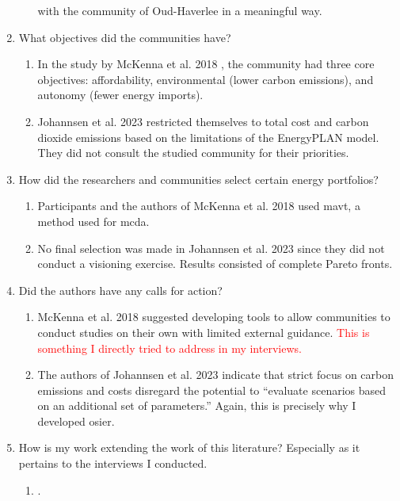 \begin{enumerate}
\begin{enumerate}
        with the community of Oud-Haverlee in a meaningful way.
    \end{enumerate}
    \item What objectives did the communities have?
    \begin{enumerate}
        \item In the study by McKenna et al. 2018 \cite{mckenna_combining_2018},
        the community had three core objectives: affordability, environmental
        (lower carbon emissions), and autonomy (fewer energy imports).
        \item Johannsen et al. 2023 \cite{johannsen_municipal_2023} restricted themselves
        to total cost and carbon dioxide emissions based on the limitations of
        the EnergyPLAN model. They did not consult the studied community for their 
        priorities.
    \end{enumerate}
    \item How did the researchers and communities select certain energy
    portfolios?
    \begin{enumerate}
        \item Participants and the authors of McKenna et al. 2018
        \cite{mckenna_combining_2018} used \ac{mavt}, a method used for
        \ac{mcda}.
        \item No final selection was made in Johannsen et al. 2023 \cite{johannsen_municipal_2023}
        since they did not conduct a visioning exercise. Results consisted of complete Pareto fronts.
    \end{enumerate}
    \item Did the authors have any calls for action?
    \begin{enumerate}
        \item McKenna et al. 2018 \cite{mckenna_combining_2018} suggested
        developing tools to allow communities to conduct studies on their own
        with limited external guidance. \textcolor{red}{This is something I
        directly tried to address in my interviews.}
        \item The authors of Johannsen et al. 2023 \cite{johannsen_municipal_2023} 
        indicate that strict focus on carbon emissions and costs disregard the 
        potential to ``evaluate scenarios based on an additional set of 
        parameters.'' Again, this is precisely why I developed \ac{osier}.
    \end{enumerate}
    \item How is my work extending the work of this literature? Especially as it
    pertains to the interviews I conducted.
    \begin{enumerate}
        \item .
    \end{enumerate}
\end{enumerate}



